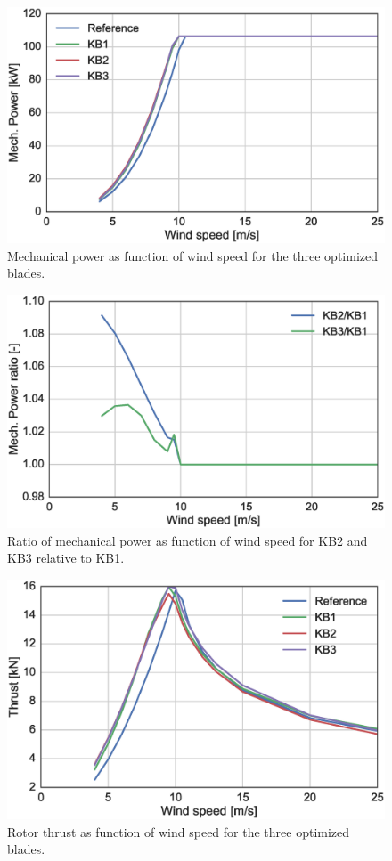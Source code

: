 \begin{figure}[!ht]
\begin{center}
	\includegraphics[width=.85\linewidth]{figures/KB_power_curve.eps}
\end{center}
\caption{Mechanical power as function of wind speed for the three optimized blades.}
\label{fig:power}
\end{figure}

\begin{figure}[!ht]
\begin{center}
	\includegraphics[width=.85\linewidth]{figures/KB_power_ratio.eps}
\end{center}
\caption{Ratio of mechanical power as function of wind speed for KB2 and KB3 relative to KB1.}
\label{fig:powerratio}
\end{figure}

\begin{figure}[!ht]
\begin{center}
	\includegraphics[width=.85\linewidth]{figures/KB_thrust.eps}
\end{center}
\caption{Rotor thrust as function of wind speed for the three optimized blades.}
\label{fig:thrust}
\end{figure}

